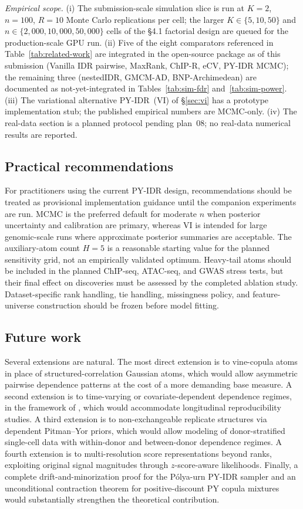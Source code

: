 \emph{Empirical scope.}
(i) The submission-scale simulation slice is run at $K{=}2$, $n{=}100$, $R{=}10$
Monte Carlo replications per cell; the larger $K\in\{5,10,50\}$ and
$n\in\{2{,}000,10{,}000,50{,}000\}$ cells of the §4.1 factorial design are
queued for the production-scale GPU run.
(ii) Five of the eight comparators referenced in
Table~\ref{tab:related-work} are integrated in the open-source package as
of this submission (Vanilla IDR pairwise, MaxRank, ChIP-R, eCV, PY-IDR
MCMC); the remaining three (nestedIDR, GMCM-AD, BNP-Archimedean) are
documented as not-yet-integrated in Tables~\ref{tab:sim-fdr}
and~\ref{tab:sim-power}.
(iii) The variational alternative PY-IDR~(VI) of \S\ref{sec:vi} has a
prototype implementation stub; the published empirical numbers are
MCMC-only.
(iv) The real-data section is a planned protocol pending plan~08; no
real-data numerical results are reported.

\subsection{Practical recommendations}

For practitioners using the current PY-IDR design, recommendations should be treated as provisional implementation guidance until the companion experiments are run. MCMC is the preferred default for moderate $n$ when posterior uncertainty and calibration are primary, whereas VI is intended for large genomic-scale runs where approximate posterior summaries are acceptable. The auxiliary-atom count $H=5$ is a reasonable starting value for the planned sensitivity grid, not an empirically validated optimum. Heavy-tail atoms should be included in the planned ChIP-seq, ATAC-seq, and GWAS stress tests, but their final effect on discoveries must be assessed by the completed ablation study. Dataset-specific rank handling, tie handling, missingness policy, and feature-universe construction should be frozen before model fitting.

\subsection{Future work}

Several extensions are natural. The most direct extension is to vine-copula atoms in place of structured-correlation Gaussian atoms, which would allow asymmetric pairwise dependence patterns at the cost of a more demanding base measure. A second extension is to time-varying or covariate-dependent dependence regimes, in the framework of \citet{DallaValleLeisenRossiniZhu2024}, which would accommodate longitudinal reproducibility studies. A third extension is to non-exchangeable replicate structures via dependent Pitman--Yor priors, which would allow modeling of donor-stratified single-cell data with within-donor and between-donor dependence regimes. A fourth extension is to multi-resolution score representations beyond ranks, exploiting original signal magnitudes through $z$-score-aware likelihoods. Finally, a complete drift-and-minorization proof for the P\'olya-urn PY-IDR sampler and an unconditional contraction theorem for positive-discount PY copula mixtures would substantially strengthen the theoretical contribution.

